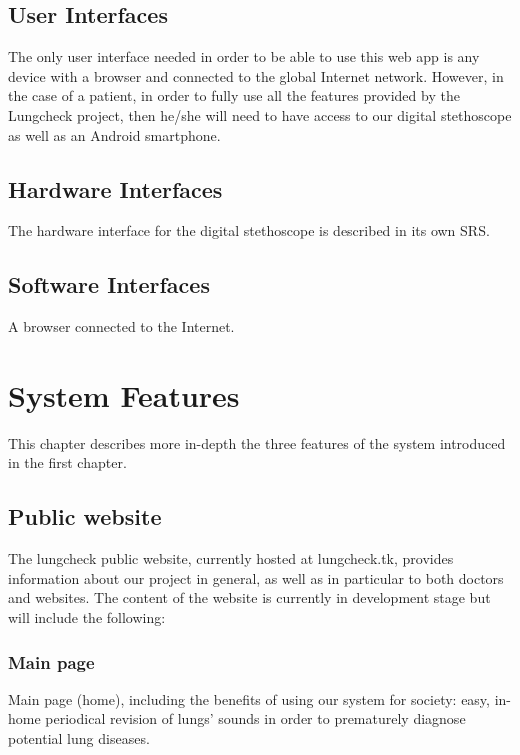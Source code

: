 \documentclass{scrreprt}
\begin{document}
\section{User Interfaces}
The only user interface needed in order to be able to use this web app is any device with a browser and connected to the global Internet network. However, in the case of a patient, in order to fully use all the features provided by the Lungcheck project, then he/she will need to have access to our digital stethoscope as well as an Android smartphone.

\section{Hardware Interfaces}
The hardware interface for the digital stethoscope is described in its own SRS.

\section{Software Interfaces}
A browser connected to the Internet.






\chapter{System Features}
This chapter describes more in-depth the three features of the system introduced in the first chapter.

\section{Public website}
The lungcheck public website, currently hosted at lungcheck.tk, provides information about our project in general, as well as in particular to both doctors and websites. The content of the website is currently in development stage but will include the following:

\subsection{Main page}
Main page (home), including the benefits of using our system for society: easy, in-home periodical revision of lungs' sounds in order to prematurely diagnose potential lung diseases.
\end{document}

